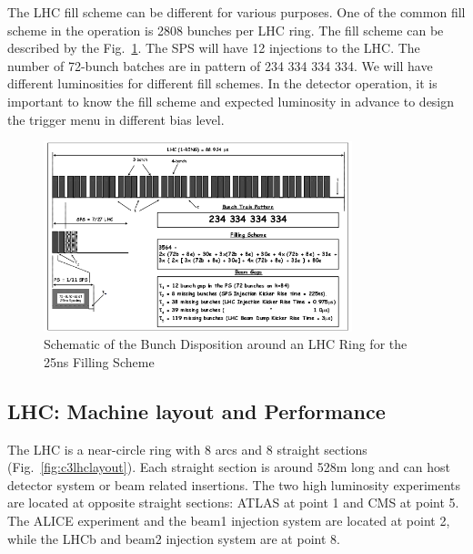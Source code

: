 The LHC fill scheme can be different for various purposes. One of the common fill scheme in the operation is 2808 bunches per LHC ring. The fill scheme can be described by the Fig.~\ref{fig:c3lhcfillscheme}. The SPS will have 12 injections to the LHC. The number of 72-bunch batches are in pattern of 234 334 334 334. We will have different luminosities for different fill schemes. In the detector operation, it is important to know the fill scheme and expected luminosity in advance to design the trigger menu in different bias level. 

\begin{figure}[htbp]
 \begin{center}
  \includegraphics[width=0.8\textwidth]{figures/c3/c3_lhc_fillscheme.png}
 \end{center}
 \caption{Schematic of the Bunch Disposition around an LHC Ring for the 25ns Filling Scheme}
 \label{fig:c3lhcfillscheme}
\end{figure}

\subsection{LHC: Machine layout and Performance}

The LHC is a near-circle ring with 8 arcs and 8 straight sections (Fig.~\ref{fig:c3lhclayout}). Each straight section is around 528m long and can host detector system or beam related insertions. The two high luminosity experiments are located at opposite straight sections: ATLAS at point 1 and CMS at point 5. The ALICE experiment and the beam1 injection system are located at point 2, while the LHCb and beam2 injection system are at point 8. 

